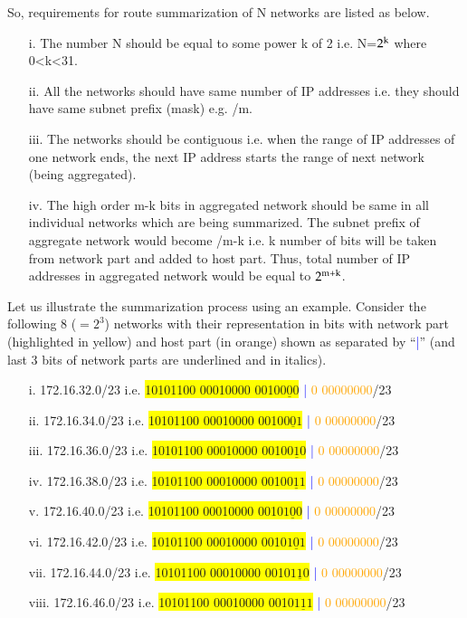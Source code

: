 \begin{multicols}{2}
So, requirements for route summarization of N networks are listed as below. 
\begin{itemize}
\item[i.] The number N should be equal to some power k of 2 i.e. N=$2^{\rm k}$ where 0<k<31.
\item[ii.] All the networks should have same number of IP addresses i.e. they should have same subnet prefix (mask) e.g. /m.
\item[iii.] The networks should be contiguous i.e. when the range of IP addresses of one network ends, the next IP address starts the range of next network (being aggregated).
\item[iv.] The high order m-k bits in aggregated network should be same in all individual networks which are being summarized. The subnet prefix of aggregate network would become /m-k i.e. k number of bits will be taken from network part and added to host part. Thus, total number of IP addresses in aggregated network would be equal to $2^{\rm m+k}$.
\end{itemize}

Let us illustrate the summarization process using an example. Consider the following 8 ($=2^{3}$) networks with their representation in bits with network part (highlighted in yellow) and host part (in orange) shown as separated by “\textcolor{blue}{|}” (and last 3 bits of network parts are underlined and in italics).
\begin{itemize}
\item[i.] 172.16.32.0/23 i.e. \colorbox{yellow}{10101100 00010000 0010$\underline{\textit{000}}$} \textcolor{blue}{|} \textcolor{orange}{0 00000000}/23
\item[ii.] 172.16.34.0/23 i.e. \colorbox{yellow}{10101100 00010000 0010$\underline{\textit{001}}$} \textcolor{blue}{|} \textcolor{orange}{0 00000000}/23
\item[iii.] 172.16.36.0/23 i.e. \colorbox{yellow}{10101100 00010000 0010$\underline{\textit{010}}$} \textcolor{blue}{|} \textcolor{orange}{0 00000000}/23
\item[iv.] 172.16.38.0/23 i.e. \colorbox{yellow}{10101100 00010000 0010$\underline{\textit{011}}$} \textcolor{blue}{|} \textcolor{orange}{0 00000000}/23
\item[v.] 172.16.40.0/23 i.e. \colorbox{yellow}{10101100 00010000 0010$\underline{\textit{100}}$} \textcolor{blue}{|} \textcolor{orange}{0 00000000}/23
\item[vi.] 172.16.42.0/23 i.e. \colorbox{yellow}{10101100 00010000 0010$\underline{\textit{101}}$} \textcolor{blue}{|} \textcolor{orange}{0 00000000}/23
\item[vii.] 172.16.44.0/23 i.e. \colorbox{yellow}{10101100 00010000 0010$\underline{\textit{110}}$} \textcolor{blue}{|} \textcolor{orange}{0 00000000}/23
\item[viii.] 172.16.46.0/23 i.e. \colorbox{yellow}{10101100 00010000 0010$\underline{\textit{111}}$} \textcolor{blue}{|} \textcolor{orange}{0 00000000}/23
\end{itemize}


\end{multicols}
